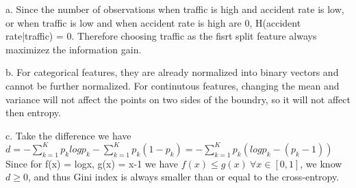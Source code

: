 \documentclass[12pt]{article}
\newenvironment{problem}[2][Problem]{\begin{trivlist}
\item[\hskip \labelsep {\bfseries #1}\hskip \labelsep {\bfseries #2}]}{\end{trivlist}}
\begin{document}
\begin{problem}{3. Decision Trees}
\item{a.}
Since the number of observations when traffic is high and accident rate is low, or when traffic is low and when accident rate is high are 0, H(accident rate|traffic) = 0. Therefore choosing traffic as the fisrt split feature always maximizez the information gain.
\item{b.}
For categorical features, they are already normalized into binary vectors and cannot be further normalized. For continutous features, changing the mean and variance will not affect the points on two sides of the boundry, so it will not affect then entropy.
\item{c.}
  Take the difference we have $d = -\sum_{k=1}^Kp_klogp_k - \sum_{k=1}^Kp_k(1-p_k) = -\sum_{k=1}^Kp_k(logp_k-(p_k-1))$\\
  Since for f(x) = logx, g(x) = x-1 we have $f(x) \leq g(x) \ \forall x \in [0, 1]$, we know $d \geq 0$, and thus Gini index is always smaller than or equal to the cross-entropy.
\end{problem}
\end{document}
